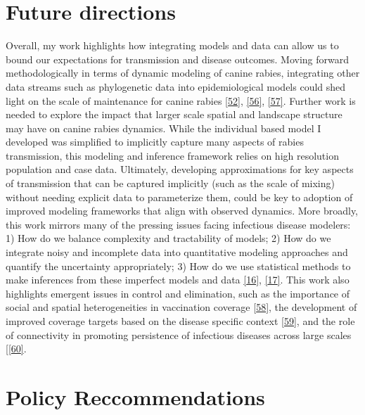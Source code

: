 \documentclass[
  oneside]{book}
\begin{document}
\hypertarget{future-directions}{%
\section{Future directions}\label{future-directions}}

Overall, my work highlights how integrating models and data can allow us to bound our expectations for transmission and disease outcomes. Moving forward methodologically in terms of dynamic modeling of canine rabies, integrating other data streams such as phylogenetic data into epidemiological models could shed light on the scale of maintenance for canine rabies \protect\hyperlink{ref-bourhy2016}{{[}52{]}}, \protect\hyperlink{ref-brunker2018}{{[}56{]}}, \protect\hyperlink{ref-dellicour2017}{{[}57{]}}. Further work is needed to explore the impact that larger scale spatial and landscape structure may have on canine rabies dynamics. While the individual based model I developed was simplified to implicitly capture many aspects of rabies transmission, this modeling and inference framework relies on high resolution population and case data. Ultimately, developing approximations for key aspects of transmission that can be captured implicitly (such as the scale of mixing) without needing explicit data to parameterize them, could be key to adoption of improved modeling frameworks that align with observed dynamics. More broadly, this work mirrors many of the pressing issues facing infectious disease modelers: 1) How do we balance complexity and tractability of models; 2) How do we integrate noisy and incomplete data into quantitative modeling approaches and quantify the uncertainty appropriately; 3) How do we use statistical methods to make inferences from these imperfect models and data \protect\hyperlink{ref-funk2020}{{[}16{]}}, \protect\hyperlink{ref-park2020}{{[}17{]}}. This work also highlights emergent issues in control and elimination, such as the importance of social and spatial heterogeneities in vaccination coverage \protect\hyperlink{ref-takahashi2017}{{[}58{]}}, the development of improved coverage targets based on the disease specific context \protect\hyperlink{ref-funk2019}{{[}59{]}}, and the role of connectivity in promoting persistence of infectious diseases across large scales {[}\protect\hyperlink{ref-kraemer2018}{{[}60{]}}.

\hypertarget{policy-reccommendations}{%
\section{Policy Reccommendations}\label{policy-reccommendations}}
\end{document}
